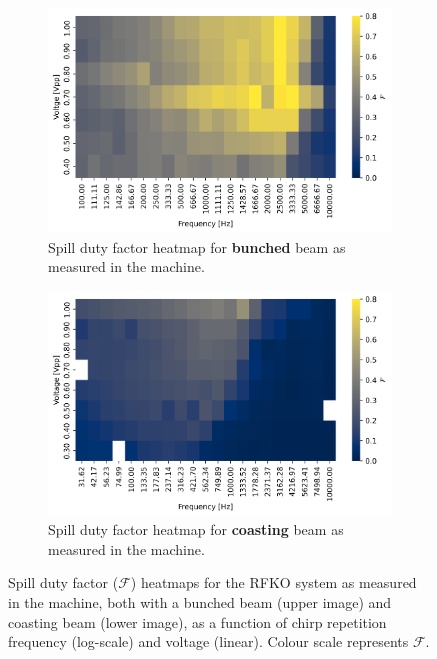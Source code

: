 \documentclass[a4paper,twoside,11pt]{report}
\begin{document}
\begin{figure}[h]
  \centering
  \begin{subfigure}[b]{0.9\linewidth}
    \includegraphics*[width=\linewidth]{sdf_on_meas.png}
    \caption{Spill duty factor heatmap for \textbf{bunched} beam as measured in the machine.}\label{sdf_on_meas}
  \end{subfigure}
  \begin{subfigure}[b]{0.9\linewidth}
    \includegraphics*[width=\linewidth]{sdf_off_meas.png}
    \caption{Spill duty factor heatmap for \textbf{coasting} beam as measured in the machine.}\label{sdf_off_meas}
  \end{subfigure}
  \cprotect\caption[Spill duty factor heatmaps for bunched and coasting beams]{Spill duty factor ($\mathcal{F}$) heatmaps for the RFKO system as measured in the machine, both with a bunched beam (upper image) and coasting beam (lower image), as a function of chirp repetition frequency (log-scale) and voltage (linear). Colour scale represents $\mathcal{F}$.}\label{fig:sdf_meas}
\end{figure}
\end{document}
